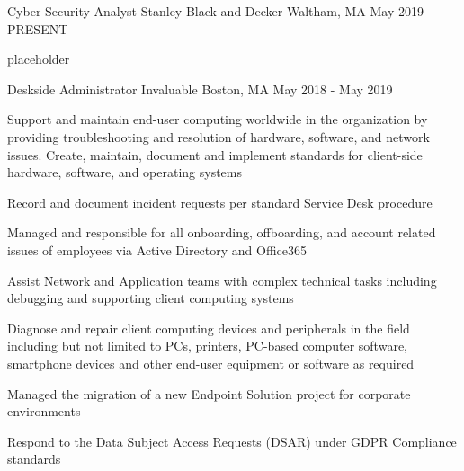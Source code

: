 
\begin{cventries}
  \cventry
    {Cyber Security Analyst} %
    {Stanley Black and Decker} %
    {Waltham, MA} %
    {May 2019 - PRESENT} %
    {
      \begin{cvitems} %
        \item {placeholder}
      \end{cvitems}
    }

  \cventry
    {Deskside Administrator} %
    {Invaluable} %
    {Boston, MA} %
    {May 2018 - May 2019} %
    {
      \begin{cvitems} %
        \item {Support and maintain end-user computing worldwide in the organization by providing troubleshooting and
        resolution of hardware, software, and network issues. Create, maintain, document and implement standards for
        client-side hardware, software, and operating systems}
        \item {Record and document incident requests per standard Service Desk procedure}
        \item {Managed and responsible for all onboarding, offboarding, and account related issues of employees via Active
        Directory and Office365}
        \item {Assist Network and Application teams with complex technical tasks including debugging and supporting client
        computing systems}
        \item {Diagnose and repair client computing devices and peripherals in the field including but not limited to PCs,
        printers, PC-based computer software, smartphone devices and other end-user equipment or software as
        required}
        \item {Managed the migration of a new Endpoint Solution project for corporate environments}
        \item {Respond to the Data Subject Access Requests (DSAR) under GDPR Compliance standards}
      \end{cvitems}
    }


\end{cventries}
